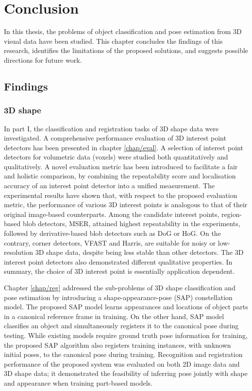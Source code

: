 \chapter{Conclusion}
\label{chap/conclusion}

In this thesis, the problems of object classification and pose estimation from 3D visual data have been studied. This chapter concludes the findings of this research, identifies the limitations of the proposed solutions, and suggests possible directions for future work.  

\section{Findings}

\subsection{3D shape}

In part I, the classification and registration tasks of 3D shape data were investigated. A comprehensive performance evaluation of 3D interest point detectors has been presented in chapter \ref{chap/eval}. A selection of interest point detectors for volumetric data (voxels) were studied both quantitatively and qualitatively. A novel evaluation metric has been introduced to facilitate a fair and holistic comparison, by combining the repeatability score and localisation accuracy of an interest point detector into a unified measurement. The experimental results have shown that, with respect to the proposed evaluation metric, the performance of various 3D interest points is analogous to that of their original image-based counterparts. Among the candidate interest points, region-based blob detectors, \eg MSER, attained highest repeatability in the experiments, followed by derivative-based blob detectors such as DoG or HoG. On the contrary, corner detectors, \eg VFAST and Harris, are suitable for noisy or low-resolution 3D shape data, despite being less stable than other detectors. The 3D interest point detectors also demonstrated different qualitative properties. In summary, the choice of 3D interest point is essentially application dependent. 

Chapter \ref{chap/reg} addressed the sub-problems of 3D shape classification and pose estimation by introducing a shape-appearance-pose (SAP) constellation model. The proposed SAP model learns appearances and locations of object parts in a canonical reference frame in training. On the other hand, SAP model classifies an object and simultaneously registers it to the canonical pose during testing. While existing models require ground truth pose information for training, the proposed SAP algorithm also registers training instances, with unknown initial poses, to the canonical pose during training. Recognition and registration performance of the proposed system was evaluated on both 2D image data and 3D shape data; it demonstrated the feasibility of inferring pose jointly with shape and appearance when training part-based models. 

